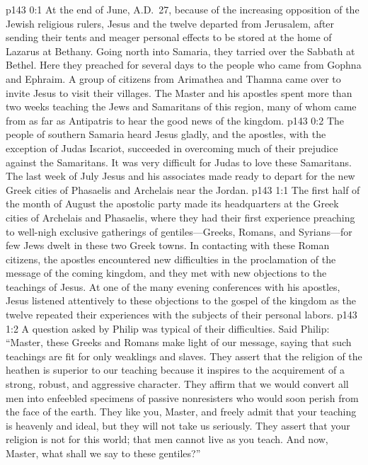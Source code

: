\author{Midwayer Commission}
\vs p143 0:1 At the end of June, A.D.~27, because of the increasing opposition of the Jewish religious rulers, Jesus and the twelve departed from Jerusalem, after sending their tents and meager personal effects to be stored at the home of Lazarus at Bethany. Going north into Samaria, they tarried over the Sabbath at Bethel. Here they preached for several days to the people who came from Gophna and Ephraim. A group of citizens from Arimathea and Thamna came over to invite Jesus to visit their villages. The Master and his apostles spent more than two weeks teaching the Jews and Samaritans of this region, many of whom came from as far as Antipatris to hear the good news of the kingdom.\plusone
\vs p143 0:2 The people of southern Samaria heard Jesus gladly, and the apostles, with the exception of Judas Iscariot, succeeded in overcoming much of their prejudice against the Samaritans. It was very difficult for Judas to love these Samaritans. The last week of July Jesus and his associates made ready to depart for the new Greek cities of Phasaelis and Archelais near the Jordan.
%
\vs p143 1:1 The first half of the month of August the apostolic party made its headquarters at the Greek cities of Archelais and Phasaelis, where they had their first experience preaching to well\hyp{}nigh exclusive gatherings of gentiles---Greeks, Romans, and Syrians---for few Jews dwelt in these two Greek towns. In contacting with these Roman citizens, the apostles encountered new difficulties in the proclamation of the message of the coming kingdom, and they met with new objections to the teachings of Jesus. At one of the many evening conferences with his apostles, Jesus listened attentively to these objections to the gospel of the kingdom as the twelve repeated their experiences with the subjects of their personal labors.
\vs p143 1:2 A question asked by Philip was typical of their difficulties. Said Philip: “Master, these Greeks and Romans make light of our message, saying that such teachings are fit for only weaklings and slaves. They assert that the religion of the heathen is superior to our teaching because it inspires to the acquirement of a strong, robust, and aggressive character. They affirm that we would convert all men into enfeebled specimens of passive nonresisters who would soon perish from the face of the earth. They like you, Master, and freely admit that your teaching is heavenly and ideal, but they will not take us seriously. They assert that your religion is not for this world; that men cannot live as you teach. And now, Master, what shall we say to these gentiles?”
